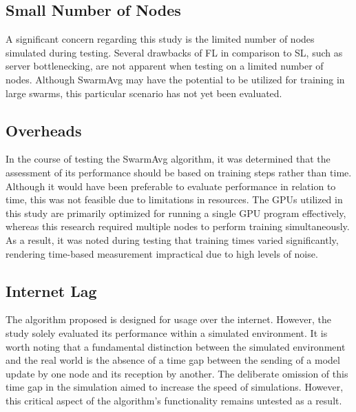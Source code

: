 \subsection{Small Number of Nodes}
A significant concern regarding this study is the limited number of nodes simulated during testing. Several drawbacks of FL in comparison to SL, such as server bottlenecking, are not apparent when testing on a limited number of nodes. Although SwarmAvg may have the potential to be utilized for training in large swarms, this particular scenario has not yet been evaluated.

\subsection{Overheads}
In the course of testing the SwarmAvg algorithm, it was determined that the assessment of its performance should be based on training steps rather than time. Although it would have been preferable to evaluate performance in relation to time, this was not feasible due to limitations in resources. The GPUs utilized in this study are primarily optimized for running a single GPU program effectively, whereas this research required multiple nodes to perform training simultaneously. As a result, it was noted during testing that training times varied significantly, rendering time-based measurement impractical due to high levels of noise.

\subsection{Internet Lag}
The algorithm proposed is designed for usage over the internet. However, the study solely evaluated its performance within a simulated environment. It is worth noting that a fundamental distinction between the simulated environment and the real world is the absence of a time gap between the sending of a model update by one node and its reception by another. The deliberate omission of this time gap in the simulation aimed to increase the speed of simulations. However, this critical aspect of the algorithm's functionality remains untested as a result.